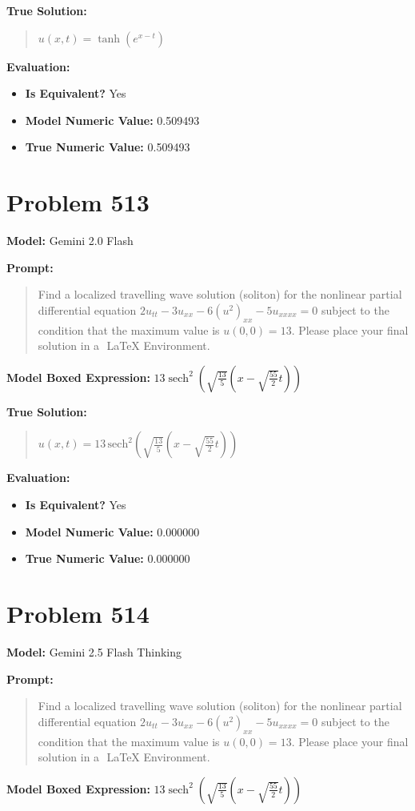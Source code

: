 \documentclass{article}
\begin{document}
\textbf{True Solution:}
\begin{quote}
$u(x,t) = \tanh(e^{x - t})$
\end{quote}

\textbf{Evaluation:}
\begin{itemize}
\item \textbf{Is Equivalent?} Yes
\item \textbf{Model Numeric Value:} 0.509493
\item \textbf{True Numeric Value:} 0.509493
\end{itemize}
\vspace{1cm}
\section*{Problem 513}
\textbf{Model:} Gemini 2.0 Flash

\textbf{Prompt:}
\begin{quote}
Find a localized travelling wave solution (soliton) for the nonlinear partial differential equation $2u_{tt} - 3u_{xx} - 6(u^2)_{xx} - 5u_{xxxx}=0$ subject to the condition that the maximum value is $u(0,0) = 13$. Please place your final solution in a $\boxed{}$ LaTeX Environment.
\end{quote}
\textbf{Model Boxed Expression:} $13 \operatorname{sech}^2\left(\sqrt{\frac{13}{5}}\left(x - \sqrt{\frac{55}{2}}t\right)\right)$

\textbf{True Solution:}
\begin{quote}
$u(x,t) = 13\,\mathrm{sech}^2\left(\sqrt{\frac{13}{5}}\left(x-\sqrt{\frac{55}{2}}t\right)\right)$
\end{quote}

\textbf{Evaluation:}
\begin{itemize}
\item \textbf{Is Equivalent?} Yes
\item \textbf{Model Numeric Value:} 0.000000
\item \textbf{True Numeric Value:} 0.000000
\end{itemize}
\vspace{1cm}
\section*{Problem 514}
\textbf{Model:} Gemini 2.5 Flash Thinking

\textbf{Prompt:}
\begin{quote}
Find a localized travelling wave solution (soliton) for the nonlinear partial differential equation $2u_{tt} - 3u_{xx} - 6(u^2)_{xx} - 5u_{xxxx}=0$ subject to the condition that the maximum value is $u(0,0) = 13$. Please place your final solution in a $\boxed{}$ LaTeX Environment.
\end{quote}
\textbf{Model Boxed Expression:} $13\operatorname{sech}^2\left(\sqrt{\frac{13}{5}}\left(x-\sqrt{\frac{55}{2}}t\right)\right)$
\end{document}

